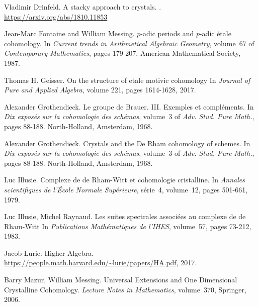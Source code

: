 \documentclass[11pt]{article}
\theoremstyle{plain}
\theoremstyle{definition}
\theoremstyle{remark}
\numberwithin{equation}{section}
\begin{document}
\begin{thebibliography}{9999}
Vladimir Drinfeld.
\newblock A stacky approach to crystals.
.
\newblock \url{https://arxiv.org/abs/1810.11853}

Jean-Marc Fontaine and William Messing.
\newblock $p$-adic periods and $p$-adic étale cohomology.
\newblock In {\em Current trends in Arithmetical Algebraic Geometry}, volume~67 of {\em Contemporary Mathematics}, pages 179-207, American Mathematical Society, 1987.

Thomas H. Geisser.
\newblock On the structure of etale motivic cohomology
\newblock In {\em Journal of Pure and Applied Algebra}, volume 221, pages 1614-1628, 2017.

Alexander Grothendieck.
\newblock Le groupe de {B}rauer. {III}. {E}xemples et compl\'{e}ments.
\newblock In {\em Dix expos\'{e}s sur la cohomologie des sch\'{e}mas}, volume~3
of {\em Adv. Stud. Pure Math.}, pages 88-188. North-Holland, Amsterdam,
1968.

Alexander Grothendieck.
\newblock Crystals and the De Rham cohomology of schemes.
\newblock In {\em Dix expos\'{e}s sur la cohomologie des sch\'{e}mas}, volume~3
of {\em Adv. Stud. Pure Math.}, pages 88-188. North-Holland, Amsterdam,
1968.

Luc Illusie.
\newblock Complexe de de Rham-Witt et cohomologie cristalline.
\newblock In {\em Annales scientifiques de l'École Normale Supérieure}, série~4, volume~12,
pages 501-661, 1979.

Luc Illusie, Michel Raynaud.
\newblock Les suites spectrales associées au complexe de de Rham-Witt
\newblock In {\em Publications Mathématiques de l'IHES}, volume~57, pages 73-212, 1983.



Jacob Lurie.
\newblock Higher Algebra.
\newblock \url{https://people.math.harvard.edu/~lurie/papers/HA.pdf}, 2017.

Barry Mazur, William Messing.
\newblock Universal Extensions and One Dimensional Crystalline Cohomology.
\newblock \textit{Lecture Notes in Mathematics}, volume~370, Springer, 2006.



\end{thebibliography}
\end{document}
